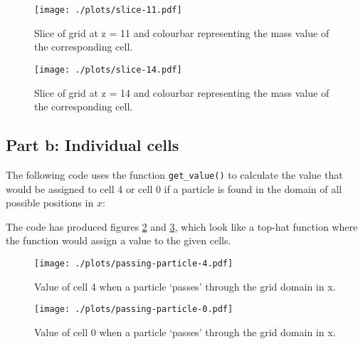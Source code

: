 \documentclass{article}
\begin{document}
\begin{figure}[h]
\centering
\begin{minipage}[t]{7.8cm}
    \centering
    \texttt{[image: ./plots/slice-11.pdf]}
    \caption{Slice of grid at z = 11 and colourbar representing the mass value of the corresponding cell.}
    \label{fig:slice11}
\end{minipage}
\qquad
\begin{minipage}[t]{7.8cm}
    \centering
    \texttt{[image: ./plots/slice-14.pdf]}
    \caption{Slice of grid at z = 14 and colourbar representing the mass value of the corresponding cell.}
    \label{fig:slice14}
\end{minipage}
\end{figure}

\subsection{Part b: Individual cells}
The following code uses the function \verb+get_value()+ to calculate the value that would be assigned to cell 4 or cell 0 if a particle is found in the domain of all possible positions in $x$:


The code has produced figures \ref{fig:pass4} and \ref{fig:pass0}, which look like a top-hat function where the function would assign a value to the given cells.

\begin{figure}
    \centering
    \texttt{[image: ./plots/passing-particle-4.pdf]}
    \caption{Value of cell 4 when a particle `passes' through the grid domain in x.}
    \label{fig:pass4}
\end{figure}

\begin{figure}
    \centering
    \texttt{[image: ./plots/passing-particle-0.pdf]}
    \caption{Value of cell 0 when a particle `passes' through the grid domain in x.}
    \label{fig:pass0}
\end{figure}
\end{document}
